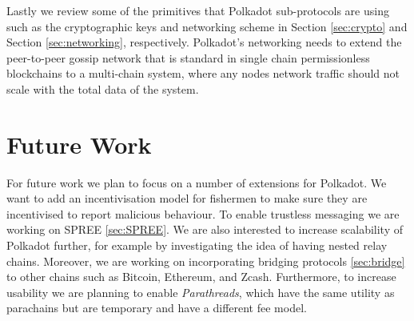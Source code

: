 Lastly we review 
some of the primitives that Polkadot sub-protocols are using such as the cryptographic keys and networking scheme in Section \ref{sec:crypto} and Section \ref{sec:networking}, respectively. Polkadot's networking needs to extend the peer-to-peer gossip network that is standard in single chain permissionless blockchains to a multi-chain system, where any nodes network traffic should not scale with the total data of the system.%

















\section{Future Work}\label{sec:futurework}
For future work we plan to focus on a number of extensions for Polkadot.
We want to add an incentivisation model for fishermen to make sure they are incentivised to report malicious behaviour. 
To enable trustless messaging we are working on SPREE \ref{sec:SPREE}. We are also interested to increase scalability of Polkadot further, for example by investigating the idea of having nested relay chains. Moreover, we are working on incorporating bridging protocols \ref{sec:bridge} to other chains  such as Bitcoin, Ethereum, and Zcash. Furthermore, to increase usability we are planning to enable \emph{Parathreads}, which have the same utility as parachains but are temporary and have a different fee model.

